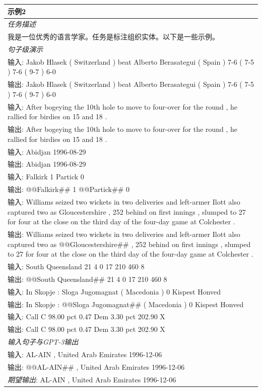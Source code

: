 \documentclass[supercite]{Experimental_Report}
\theoremstyle{definition}
\begin{document}
\begin{table}[th!]
{\begin{tabular}{l}
\textbf{示例2} \\\midrule
       	\textit{任务描述} \\
我是一位优秀的语言学家。任务是标注组织实体。以下是一些示例。 \\\midrule
\textit{句子级演示} \\
输入: Jakob Hlasek ( Switzerland ) beat Alberto Berasategui ( Spain ) 7-6 ( 7-5 ) 7-6 ( 9-7 ) 6-0 \\
输出: Jakob Hlasek ( Switzerland ) beat Alberto Berasategui ( Spain ) 7-6 ( 7-5 ) 7-6 ( 9-7 ) 6-0 \\
输入: After bogeying the 10th hole to move to four-over for the round , he rallied for birdies on 15 and 18 . \\
输出: After bogeying the 10th hole to move to four-over for the round , he rallied for birdies on 15 and 18 . \\
输入: Abidjan 1996-08-29 \\
输出: Abidjan 1996-08-29 \\
输入: Falkirk 1 Partick 0 \\
输出: @@Falkirk\#\# 1 @@Partick\#\# 0 \\
输入: Williams seized two wickets in two deliveries and left-armer Ilott also captured two as Gloucestershire , 252 behind on first innings , slumped to 27 for four at the close on the third day of the four-day game at Colchester . \\
输出: Williams seized two wickets in two deliveries and left-armer Ilott also captured two as @@Gloucestershire\#\# , 252 behind on first innings , slumped to 27 for four at the close on the third day of the four-day game at Colchester . \\
输入: South Queensland 21 4 0 17 210 460 8 \\
输出: @@South Queensland\#\# 21 4 0 17 210 460 8 \\
输入: In Skopje : Sloga Jugomagnat ( Macedonia ) 0 Kispest Honved \\
输出: In Skopje : @@Sloga Jugomagnat\#\# ( Macedonia ) 0 Kispest Honved \\
输入: Call C 98.00 pct 0.47 Dem 3.30 pct 202.90 X \\
输出: Call C 98.00 pct 0.47 Dem 3.30 pct 202.90 X \\\midrule
\textit{输入句子与GPT-3输出} \\
输入: AL-AIN , United Arab Emirates 1996-12-06 \\
输出: @@AL-AIN\#\# , United Arab Emirates 1996-12-06 \\
{\color{blue}\it 期望输出}: AL-AIN , United Arab Emirates 1996-12-06 \\\bottomrule


\end{tabular}}
\end{table}
\end{document}
